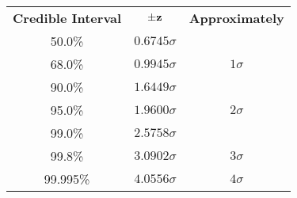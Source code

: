 \begin{center}
\begin{tabular}{ccc}
{\bf Credible Interval} & $\pm\mathbf{z}$ &  {\bf Approximately}\\
50.0\% & $ 0.6745 \sigma$&\\
68.0\% & $ 0.9945 \sigma$&$1\sigma$\\
90.0\% & $ 1.6449 \sigma$&\\
95.0\% & $ 1.9600 \sigma$&$2\sigma$\\
99.0\% & $ 2.5758 \sigma$&\\
99.8\% & $ 3.0902 \sigma$&$3\sigma$\\
99.995\% & $ 4.0556 \sigma$&$4\sigma$\\
\end{tabular}
\end{center}